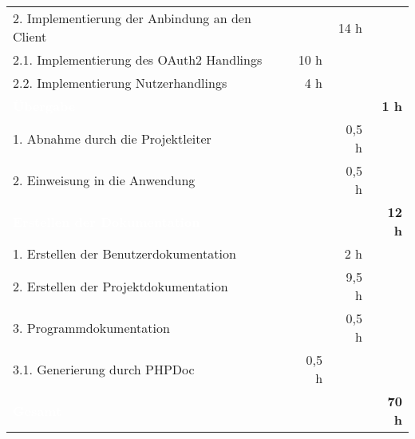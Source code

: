 \begin{tabularx}{\textwidth}{Xrrr}
2. Implementierung der Anbindung an den Client &		&		14 h		& \\
\rowcolor{odd}2.1. Implementierung des OAuth2 Handlings & 10 h   &       &  \\
2.2. Implementierung Nutzerhandlings & 4 h   &       &  \\



\rowcolor{heading}\textbf{\textcolor{white}{Übergabe}} &	\textbf{}	& \textbf{}	&	\textbf{1 h} \\
1. Abnahme durch die Projektleiter	&		&		0,5 h	&	\\
\rowcolor{odd}2. Einweisung in die Anwendung		&		&		0,5 h	& \\


\rowcolor{heading}\textbf{\textcolor{white}{Erstellen der Dokumentation}} & \textbf{} & \textbf{} & \textbf{12 h} \\
1. Erstellen der Benutzerdokumentation &       & 2 h   &  \\
\rowcolor{odd}2. Erstellen der Projektdokumentation &       & 9,5 h   &  \\
3. Programmdokumentation &       & 0,5 h   &  \\
\rowcolor{odd}3.1. Generierung durch PHPDoc & 0,5 h   &       &  \\
\hline
\hline
\rowcolor{heading}\textbf{\textcolor{white}{Gesamt}} & \textbf{} & \textbf{} & \textbf{70 h} \\
\end{tabularx}
